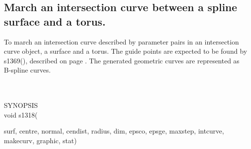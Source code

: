 \subsection{March an intersection curve between a spline surface and a torus.}
\begin{minipg1}
  To march an intersection curve described by parameter pairs in an intersection
  curve object, a surface and a torus.
  The guide points are expected to be found by s1369(), described on
  page \pageref{s1369}.
  The generated geometric curves are represented as B-spline curves.
\end{minipg1} \\ \\
SYNOPSIS\\
        \>void s1318(\begin{minipg3}
                        {\fov surf}, {\fov centre}, {\fov normal}, {\fov cendist}, {\fov radius}, {\fov dim}, {\fov epsco}, {\fov epsge},
                        {\fov maxstep}, {\fov intcurve}, {\fov makecurv}, {\fov graphic}, {\fov stat})
                \end{minipg3}\\[0.3ex]


